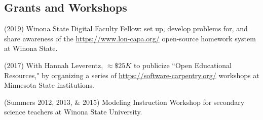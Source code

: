 \documentclass[margin,line,letterpaper]{res}
\begin{document}
\begin{resume}
\section{\bf Grants and Workshops}

(2019) Winona State Digital Faculty Fellow: set up, develop problems for, and share awareness of the \url{https://www.lon-capa.org/} open-source homework system at Winona State. 

(2017) With Hannah Leverentz, $\approx\$25K$ to publicize ``Open Educational Resources," by organizing a series of \url{https://software-carpentry.org/} workshops at Minnesota State institutions.

(Summers 2012, 2013, \& 2015) 
Modeling Instruction Workshop for secondary science teachers at Winona State University.

%
%
%
%
%
%





\end{resume}
\end{document}
